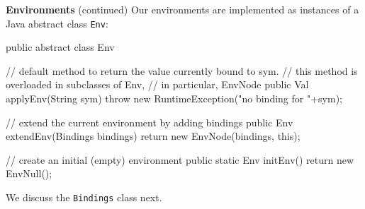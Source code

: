 \begin{minipage}[t]{\sw}
\slidenumber
\LARGE
{\bf Environments} (continued)\exx
\Large
Our environments are implemented as instances
of a Java abstract class \verb'Env':
\begin{qv}
public abstract class Env {
    // default method to return the value currently bound to sym.
    // this method is overloaded in subclasses of Env,
    // in particular, EnvNode
    public Val applyEnv(String sym) {
        throw new RuntimeException("no binding for "+sym);
    }
    
    // extend the current environment by adding bindings
    public Env extendEnv(Bindings bindings) {
        return new EnvNode(bindings, this);
    }
    
    // create an initial (empty) environment
    public static Env initEnv() {
        return new EnvNull();
    }
}
\end{qv}
We discuss the \verb'Bindings' class next.
\end{minipage}
